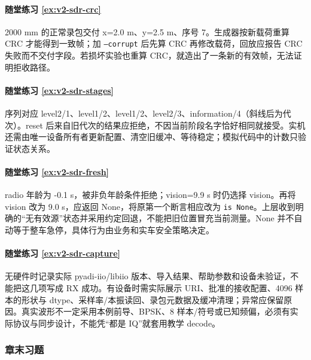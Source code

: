 \paragraph*{随堂练习 \ref{ex:v2-sdr-crc}}
\begin{solution}
2000 mm 的正常录包交付 x=2.0 m、y=2.5 m、序号 7。生成器按新载荷重算 CRC 才能得到一致帧；加 \texttt{--corrupt} 后先算 CRC 再修改载荷，回放应报告 CRC 失败而不交付字段。若损坏实验也重算 CRC，就造出了一条新的有效帧，无法证明拒收路径。
\end{solution}

\paragraph*{随堂练习 \ref{ex:v2-sdr-stages}}
\begin{solution}
序列对应 level2/1、level1/2、level1/2、level2/3、information/4（斜线后为代次）。reset 后来自旧代次的结果应拒绝，不因当前阶段名字恰好相同就接受。实机还需由唯一设备所有者更新配置、清空旧缓冲、等待稳定；模拟代码中的计数只验证状态关系。
\end{solution}

\paragraph*{随堂练习 \ref{ex:v2-sdr-fresh}}
\begin{solution}
radio 年龄为 -0.1 s，被非负年龄条件拒绝；vision=9.9 s 时仍选择 vision。再将 vision 改为 9.0 s，应返回 None，将原第一个断言相应改为 \texttt{is None}。上层收到明确的“无有效源”状态并采用约定回退，不能把旧位置冒充当前测量。None 并不自动等于整车急停，具体行为由业务和实车安全策略决定。
\end{solution}

\paragraph*{随堂练习 \ref{ex:v2-sdr-capture}}
\begin{solution}
无硬件时记录实际 pyadi-iio/libiio 版本、导入结果、帮助参数和设备未验证，不能把这几项写成 RX 成功。有设备时需实际展示 URI、批准的接收配置、4096 样本的形状与 dtype、采样率/本振读回、录包元数据及缓冲清理；异常应保留原因。真实波形不一定采用本例前导、BPSK、8 样本/符号或已知频偏，必须有实际协议与同步设计，不能凭“都是 IQ”就套用教学 decode。
\end{solution}

\subsubsection*{章末习题}
